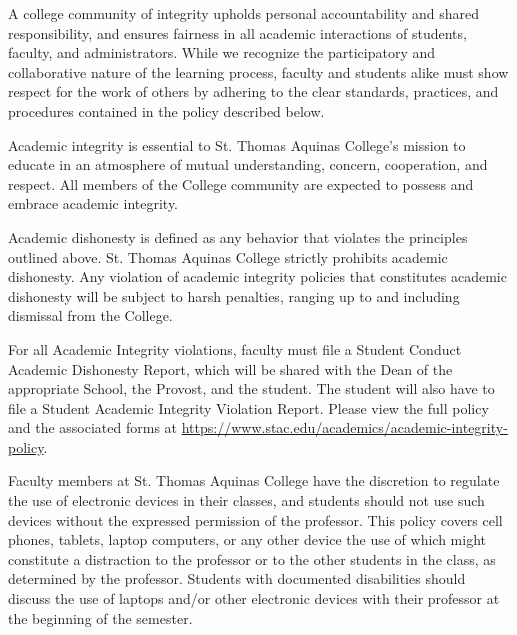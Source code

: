 \documentclass[11pt,letterpaper]{article}
\begin{document}
A college community of integrity upholds personal accountability and shared responsibility, and ensures fairness in all academic interactions of students, faculty, and administrators. While we recognize the participatory and collaborative nature of the learning process, faculty and students alike must show respect for the work of others by adhering to the clear standards, practices, and procedures contained in the policy described below. \pspace

Academic integrity is essential to St. Thomas Aquinas College's mission to educate in an atmosphere of mutual understanding, concern, cooperation, and respect. All members of the College community are expected to possess and embrace academic integrity.
\sectionbreak




Academic dishonesty is defined as any behavior that violates the principles outlined above. St. Thomas Aquinas College strictly prohibits academic dishonesty. Any violation of academic integrity policies that constitutes academic dishonesty will be subject to harsh penalties, ranging up to and including dismissal from the College. \pspace

For all Academic Integrity violations, faculty must file a Student Conduct Academic Dishonesty Report, which will be shared with the Dean of the appropriate School, the Provost, and the student. The student will also have to file a Student Academic Integrity Violation Report. Please view the full policy and the associated forms at \url{https://www.stac.edu/academics/academic-integrity-policy}.
\sectionbreak




Faculty members at St. Thomas Aquinas College have the discretion to regulate the use of electronic devices in their classes, and students should not use such devices without the expressed permission of the professor. This policy covers cell phones, tablets, laptop computers, or any other device the use of which might constitute a distraction to the professor or to the other students in the class, as determined by the professor. Students with documented disabilities should discuss the use of laptops and/or other electronic devices with their professor at the beginning of the semester. \pspace
\end{document}
